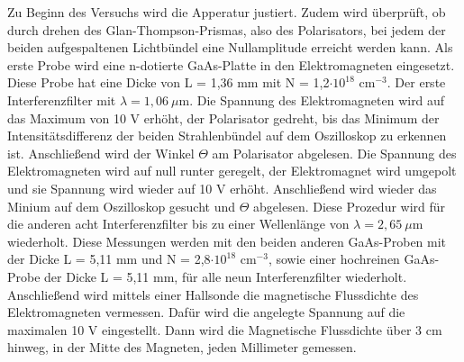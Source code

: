 Zu Beginn des Versuchs wird die Apperatur justiert. Zudem wird überprüft, ob durch drehen des Glan-Thompson-Prismas, 
also des Polarisators, bei jedem der beiden aufgespaltenen Lichtbündel eine Nullamplitude erreicht werden kann. 
Als erste Probe wird eine n-dotierte GaAs-Platte in den Elektromagneten eingesetzt. 
Diese Probe hat eine Dicke von L = 1,36 mm mit N = 1,2$\cdot 10^{18}$ cm$^{-3}$. Der erste Interferenzfilter 
mit $\lambda = 1,06 \: \mu$m. Die Spannung des Elektromagneten wird auf das Maximum von 10 V erhöht, 
der Polarisator gedreht, bis das Minimum der Intensitätsdifferenz der beiden Strahlenbündel auf dem Oszilloskop 
zu erkennen ist. Anschließend wird der Winkel $\Theta$ am Polarisator abgelesen.
Die Spannung des Elektromagneten wird auf null runter geregelt, der Elektromagnet wird umgepolt 
und sie Spannung wird wieder auf 10 V erhöht. Anschließend wird wieder das Minium auf dem Oszilloskop gesucht und 
$\Theta$ abgelesen. Diese Prozedur wird für die anderen acht Interferenzfilter bis zu einer Wellenlänge 
von $\lambda = 2,65 \: \mu$m wiederholt.
Diese Messungen werden mit den beiden anderen GaAs-Proben mit der Dicke L = 5,11 mm und N = 2,8$\cdot 10^{18}$ cm$^{-3}$, 
sowie einer hochreinen GaAs-Probe der Dicke L = 5,11 mm, für alle neun Interferenzfilter wiederholt.
Anschließend wird mittels einer Hallsonde die magnetische Flussdichte des Elektromagneten vermessen. 
Dafür wird die angelegte Spannung auf die maximalen 10 V eingestellt. 
Dann wird die Magnetische Flussdichte über 3 cm hinweg, in der Mitte des Magneten, jeden Millimeter gemessen.

